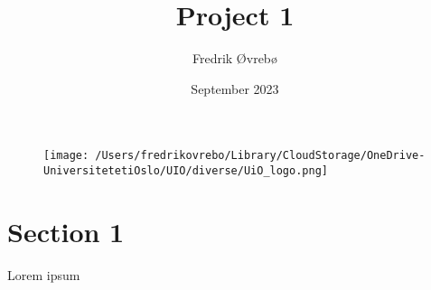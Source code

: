 \documentclass[12pt]{article}
\title{\Large\textbf{Project 1}}
\author{Fredrik Øvrebø}
\date{September 2023}
\begin{document}
\maketitle
{}


\begin{figure}[!b]
    \centering
    \texttt{[image: /Users/fredrikovrebo/Library/CloudStorage/OneDrive-UniversitetetiOslo/UIO/diverse/UiO\_logo.png]}
\end{figure}

\clearpage
 
\section*{Section 1}

Lorem ipsum
\end{document}
